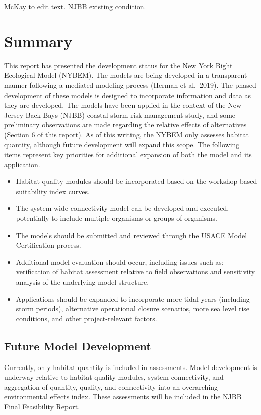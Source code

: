 \documentclass[
]{book}
\begin{document}
{McKay to edit text. NJBB existing condition.}

\hypertarget{summary}{%
\chapter{Summary}\label{summary}}

This report has presented the development status for the New York Bight Ecological Model (NYBEM). The models are being developed in a transparent manner following a mediated modeling process (Herman et al.~2019). The phased development of these models is designed to incorporate information and data as they are developed. The models have been applied in the context of the New Jersey Back Bays (NJBB) coastal storm risk management study, and some preliminary observations are made regarding the relative effects of alternatives (Section 6 of this report).
As of this writing, the NYBEM only assesses habitat quantity, although future development will expand this scope. The following items represent key priorities for additional expansion of both the model and its application.

\begin{itemize}
\item
  Habitat quality modules should be incorporated based on the workshop-based suitability index curves.
\item
  The system-wide connectivity model can be developed and executed, potentially to include multiple organisms or groups of organisms.
\item
  The models should be submitted and reviewed through the USACE Model Certification process.
\item
  Additional model evaluation should occur, including issues such as: verification of habitat assessment relative to field observations and sensitivity analysis of the underlying model structure.
\item
  Applications should be expanded to incorporate more tidal years (including storm periods), alternative operational closure scenarios, more sea level rise conditions, and other project-relevant factors.
\end{itemize}

\hypertarget{future-model-development}{%
\section{Future Model Development}\label{future-model-development}}

Currently, only habitat quantity is included in assessments. Model development is underway relative to habitat quality modules, system connectivity, and aggregation of quantity, quality, and connectivity into an overarching environmental effects index. These assessments will be included in the NJBB Final Feasibility Report.
\end{document}
